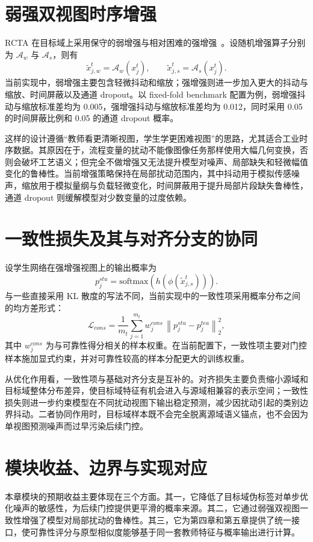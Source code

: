 \section{弱强双视图时序增强}
RCTA 在目标域上采用保守的弱增强与相对困难的强增强~\cite{xie2020uda}。设随机增强算子分别为 $\mathcal{A}_w$ 与 $\mathcal{A}_s$，则有
\begin{equation}
\tilde{x}_{j,w}^{t}=\mathcal{A}_w(x_j^t),\qquad
\tilde{x}_{j,s}^{t}=\mathcal{A}_s(x_j^t).
\end{equation}
当前实现中，弱增强主要包含轻微抖动和缩放；强增强则进一步加入更大的抖动与缩放、时间屏蔽以及通道 dropout。以 fixed-fold benchmark 配置为例，弱增强抖动与缩放标准差均为 0.005，强增强抖动与缩放标准差均为 0.012，同时采用 0.05 的时间屏蔽比例和 0.05 的通道 dropout 概率。

这样的设计遵循“教师看更清晰视图，学生学更困难视图”的思路，尤其适合工业时序数据。其原因在于，流程变量的扰动不能像图像任务那样使用大幅几何变换，否则会破坏工艺语义；但完全不做增强又无法提升模型对噪声、局部缺失和轻微幅值变化的鲁棒性。当前增强策略保持在局部扰动范围内，其中抖动用于模拟传感噪声，缩放用于模拟量纲与负载轻微变化，时间屏蔽用于提升局部片段缺失鲁棒性，通道 dropout 则缓解模型对少数变量的过度依赖。

\section{一致性损失及其与对齐分支的协同}
设学生网络在强增强视图上的输出概率为
\begin{equation}
p_j^{stu}=\mathrm{softmax}\!\left(h(\phi(\tilde{x}_{j,s}^{t}))\right).
\end{equation}
与一些直接采用 KL 散度的写法不同，当前实现中的一致性项采用概率分布之间的均方差形式：
\begin{equation}
\mathcal{L}_{cons}=
\frac{1}{m_t}\sum_{j=1}^{m_t}
w_j^{cons}\,
\left\|p_j^{stu}-p_j^{tea}\right\|_2^2,
\end{equation}
其中 $w_j^{cons}$ 为与可靠性得分相关的样本权重。在当前配置下，一致性项主要对门控样本施加显式约束，并对可靠性较高的样本分配更大的训练权重。

从优化作用看，一致性项与基础对齐分支是互补的。对齐损失主要负责缩小源域和目标域整体分布差异，使目标域特征有机会进入与源域相兼容的表示空间；一致性损失则进一步约束模型在不同扰动视图下输出稳定预测，减少因扰动引起的类别边界抖动。二者协同作用时，目标域样本既不会完全脱离源域语义锚点，也不会因为单视图预测噪声而过早污染后续门控。

\section{模块收益、边界与实现对应}
本章模块的预期收益主要体现在三个方面。其一，它降低了目标域伪标签对单步优化噪声的敏感性，为后续门控提供更平滑的概率来源。其二，它通过弱强双视图一致性增强了模型对局部扰动的鲁棒性。其三，它为第四章和第五章提供了统一接口，使可靠性评分与原型相似度能够基于同一套教师特征与概率输出进行计算。

